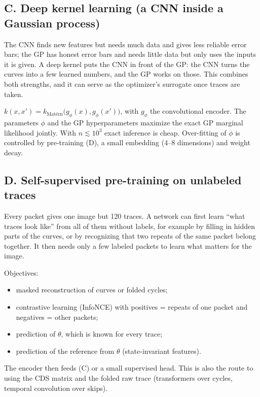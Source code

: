 \documentclass[10pt]{article}
\begin{document}
\subsection*{C. Deep kernel learning (a CNN inside a Gaussian process)}
\begin{basic}
The CNN finds new features but needs much data and gives less reliable error bars; the GP has honest error bars and needs little data
but only uses the inputs it is given. A deep kernel puts the CNN in front of the GP: the CNN turns the curves into a few learned numbers,
and the GP works on those. This combines both strengths, and it can serve as the optimizer's surrogate once traces are taken.
\end{basic}
\begin{advanced}
$k(x, x') = k_\text{Mat\'ern}\bigl(g_\phi(x), g_\phi(x')\bigr)$, with $g_\phi$ the convolutional encoder. The parameters $\phi$ and the GP
hyperparameters maximize the exact GP marginal likelihood jointly. With $n \lesssim 10^3$ exact inference is cheap. Over-fitting of
$\phi$ is controlled by pre-training (D), a small embedding (4--8 dimensions) and weight decay.
\end{advanced}

\subsection*{D. Self-supervised pre-training on unlabeled traces}
\begin{basic}
Every packet gives one image but 120 traces. A network can first learn ``what traces look like'' from all of them without labels, for
example by filling in hidden parts of the curves, or by recognizing that two repeats of the same packet belong together. It then needs
only a few labeled packets to learn what matters for the image.
\end{basic}
\begin{advanced}
Objectives:
\begin{itemize}
\item masked reconstruction of curves or folded cycles;
\item contrastive learning (InfoNCE) with positives = repeats of one packet and negatives = other packets;
\item prediction of $\theta$, which is known for every trace;
\item prediction of the reference from $\theta$ (state-invariant features).
\end{itemize}
The encoder then feeds (C) or a small supervised head. This is also the route to using the CDS matrix and the folded raw trace
(transformers over cycles, temporal convolution over skips).
\end{advanced}
\end{document}

